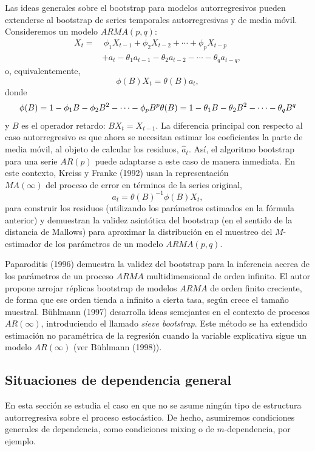 \documentclass[]{book}
\theoremstyle{definition}
\theoremstyle{definition}
\theoremstyle{definition}
\theoremstyle{remark}
\begin{document}
Las ideas generales sobre el bootstrap para modelos autorregresivos
pueden extenderse al bootstrap de series temporales autorregresivas y de
media móvil. Consideremos un modelo \(ARMA(p,q)\): \[\begin{aligned}
X_{t} =&\ \phi _1X_{t-1}+\phi _2X_{t-2}+\cdots +\phi _{p}X_{t-p} \\
&+a_{t}-\theta _1a_{t-1}-\theta _2a_{t-2}-\cdots -\theta _{q}a_{t-q},\end{aligned}\]o,
equivalentemente, \[\phi (B)X_{t}=\theta (B)a_{t},\] donde
\[\phi (B)=1-\phi _1B-\phi _2B^2-\cdots -\phi _{p}B^{p}\\ 
\theta(B)=1-\theta _1B-\theta _2B^2-\cdots -\theta _{q}B^{q}\] y \(B\)
es el operador retardo: \(BX_{t}=X_{t-1}\). La diferencia principal con
respecto al caso autorregresivo es que ahora se necesitan estimar los
coeficientes la parte de media móvil, al objeto de calcular los
residuos, \(\widehat{a}_{t}\). Así, el algoritmo bootstrap para una
serie \(AR(p)\) puede adaptarse a este caso de manera inmediata. En este
contexto, Kreiss y Franke (1992) usan la representación\\
\(MA(\infty )\) del proceso de error en términos de la series original,
\[a_{t}=\theta (B)^{-1}\phi(B) X_{t},\] para construir los residuos
(utilizando los parámetros estimados en la fórmula anterior) y
demuestran la validez asintótica del bootstrap (en el sentido de la
distancia de Mallows) para aproximar la distribución en el muestreo del
\(M\)-estimador de los parámetros de un modelo \(ARMA(p,q)\).

Paparoditis (1996) demuestra la validez del bootstrap para la inferencia
acerca de los parámetros de un proceso \(ARMA\) multidimensional de
orden infinito. El autor propone arrojar réplicas bootstrap de modelos
\(ARMA\) de orden finito creciente, de forma que ese orden tienda a
infinito a cierta tasa, según crece el tamaño muestral. Bühlmann (1997)
desarrolla ideas semejantes en el contexto de procesos
\(AR\left( \infty \right)\), introduciendo el llamado \emph{sieve
bootstrap}. Este método se ha extendido estimación no paramétrica de la
regresión cuando la variable explicativa sigue un modelo
\(AR\left( \infty \right)\) (ver Bühlmann (1998)).

\subsection{Situaciones de dependencia
general}\label{situaciones-de-dependencia-general-1}

En esta sección se estudia el caso en que no se asume ningún tipo de
estructura autorregresiva sobre el proceso estocástico. De hecho,
asumiremos condiciones generales de dependencia, como condiciones mixing
o de \(m\)-dependencia, por ejemplo.
\end{document}

